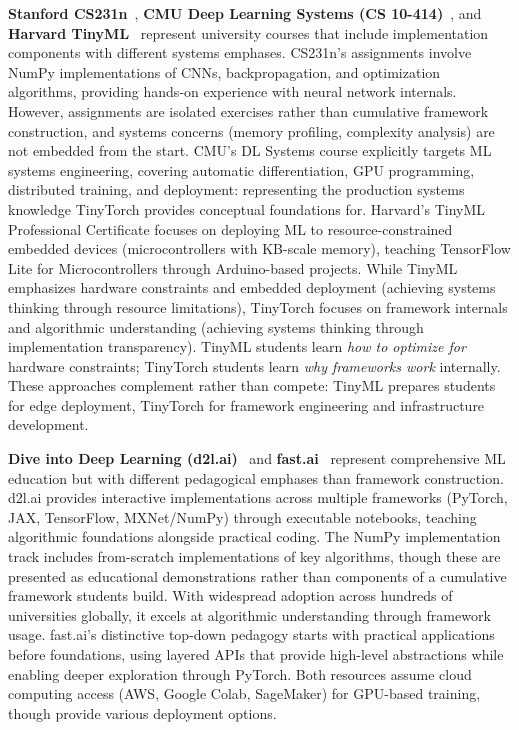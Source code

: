 \documentclass[10pt,twocolumn]{article}
\begin{document}
\textbf{Stanford CS231n}~\citep{johnson2016cs231n}, \textbf{CMU Deep Learning Systems (CS 10-414)}~\citep{chen2022dlsyscourse}, and \textbf{Harvard TinyML}~\citep{janapa_reddi2022} represent university courses that include implementation components with different systems emphases. CS231n's assignments involve NumPy implementations of CNNs, backpropagation, and optimization algorithms, providing hands-on experience with neural network internals. However, assignments are isolated exercises rather than cumulative framework construction, and systems concerns (memory profiling, complexity analysis) are not embedded from the start. CMU's DL Systems course explicitly targets ML systems engineering, covering automatic differentiation, GPU programming, distributed training, and deployment: representing the production systems knowledge TinyTorch provides conceptual foundations for. Harvard's TinyML Professional Certificate focuses on deploying ML to resource-constrained embedded devices (microcontrollers with KB-scale memory), teaching TensorFlow Lite for Microcontrollers through Arduino-based projects. While TinyML emphasizes hardware constraints and embedded deployment (achieving systems thinking through resource limitations), TinyTorch focuses on framework internals and algorithmic understanding (achieving systems thinking through implementation transparency). TinyML students learn \emph{how to optimize for} hardware constraints; TinyTorch students learn \emph{why frameworks work} internally. These approaches complement rather than compete: TinyML prepares students for edge deployment, TinyTorch for framework engineering and infrastructure development.

\textbf{Dive into Deep Learning (d2l.ai)}~\citep{zhang2023dive} and \textbf{fast.ai}~\citep{howard2020} represent comprehensive ML education but with different pedagogical emphases than framework construction. d2l.ai provides interactive implementations across multiple frameworks (PyTorch, JAX, TensorFlow, MXNet/NumPy) through executable notebooks, teaching algorithmic foundations alongside practical coding. The NumPy implementation track includes from-scratch implementations of key algorithms, though these are presented as educational demonstrations rather than components of a cumulative framework students build. With widespread adoption across hundreds of universities globally, it excels at algorithmic understanding through framework usage. fast.ai's distinctive top-down pedagogy starts with practical applications before foundations, using layered APIs that provide high-level abstractions while enabling deeper exploration through PyTorch. Both resources assume cloud computing access (AWS, Google Colab, SageMaker) for GPU-based training, though provide various deployment options.
\end{document}
